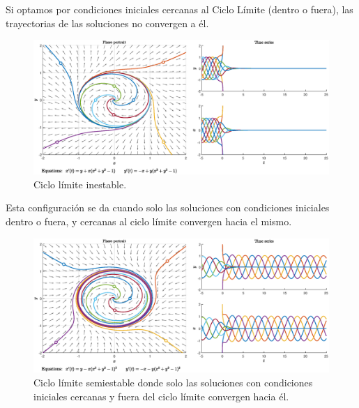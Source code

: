 \documentclass[12pt,a4paper]{report} %
\begin{document}
	\vspace{1cm}
	
	\vspace{0.5cm}Si optamos por condiciones iniciales cercanas al Ciclo Límite (dentro o fuera), las trayectorias de las soluciones no convergen a él.
	
	\begin{figure}[h]
		\centering
		\includegraphics[width=1\textwidth]{cli.eps}
		\caption{Ciclo límite inestable.}
		\label{fig:cli}
	\end{figure}\smallskip
	
	\newpage
	
	\vspace{0.5cm}
	
	\vspace{0.5cm}Esta configuración se da cuando solo las soluciones con condiciones iniciales dentro o fuera, y cercanas al ciclo límite convergen hacia el mismo.
	
	\begin{figure}[h]
		\centering
		\includegraphics[width=1\textwidth]{clpe.eps}
		\caption{Ciclo límite semiestable donde solo las soluciones con condiciones iniciales cercanas y fuera del ciclo límite convergen hacia él.}
		\label{fig:clpe}
	\end{figure}\smallskip
	
\end{document}
